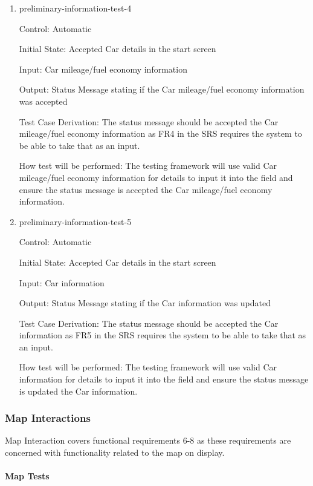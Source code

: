 \documentclass[12pt, titlepage]{article}
\begin{document}
\begin{enumerate}
\item{preliminary-information-test-4\\}

Control: Automatic
					
Initial State: Accepted Car details in the start screen
					
Input: Car mileage/fuel economy information
					
Output: Status Message stating if the Car mileage/fuel economy information was accepted

Test Case Derivation: The status message should be accepted the Car mileage/fuel economy information as FR4 in the SRS 
requires the system to be able to take that as an input.
					
How test will be performed: The testing framework will use valid Car mileage/fuel economy information for details to input 
it into the field and ensure the status message is accepted the Car mileage/fuel economy information.

\item{preliminary-information-test-5\\}

Control: Automatic
					
Initial State: Accepted Car details in the start screen
					
Input: Car information
					
Output: Status Message stating if the Car information was updated

Test Case Derivation: The status message should be accepted the Car information as FR5 in the SRS 
requires the system to be able to take that as an input.
					
How test will be performed: The testing framework will use valid Car information for details to input 
it into the field and ensure the status message is updated the Car information.

\end{enumerate}

\subsubsection{Map Interactions} \label{MI}

Map Interaction covers functional requirements 6-8 as these requirements 
are concerned with functionality related to the map on display.
		
\paragraph{Map Tests}
\end{document}
